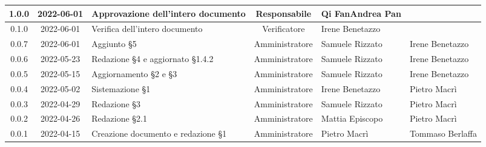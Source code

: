 \begin{center}
\begin{longtable}{ |c|c|p{8em}|c|m{5em}|m{6em}| }
		\hline
		1.0.0 & 2022-06-01 & Approvazione dell'intero documento & Responsabile &Qi Fan\newline Andrea Pan & \\
		\hline
		0.1.0 & 2022-06-01 & Verifica dell'intero documento & Verificatore &Irene \newline Benetazzo & \\
		\hline
		0.0.7 & 2022-06-01 & Aggiunto §5 & Amministratore & Samuele \newline Rizzato & Irene \newline Benetazzo \\
		\hline
		0.0.6 & 2022-05-23 & Redazione §4 e aggiornato §1.4.2 & Amministratore & Samuele \newline Rizzato & Irene \newline Benetazzo \\
		\hline
		0.0.5 & 2022-05-15 & Aggiornamento §2 e §3 & Amministratore & Samuele \newline Rizzato & Irene \newline Benetazzo \\
		\hline
		0.0.4 & 2022-05-02 & Sistemazione §1 & Amministratore & Irene \newline Benetazzo & Pietro \newline Macrì\\
		\hline
		0.0.3 & 2022-04-29 & Redazione §3 & Amministratore & Samuele \newline Rizzato & Pietro \newline Macrì\\
		\hline
		0.0.2 & 2022-04-26 & Redazione §2.1 & Amministratore & Mattia \newline Episcopo & Pietro \newline Macrì\\
		\hline
		0.0.1 & 2022-04-15 & Creazione documento e redazione §1 & Amministratore & Pietro \newline Macrì & Tommaso \newline Berlaffa\\
		\hline
	\end{longtable}
	\end{center}
	\newpage